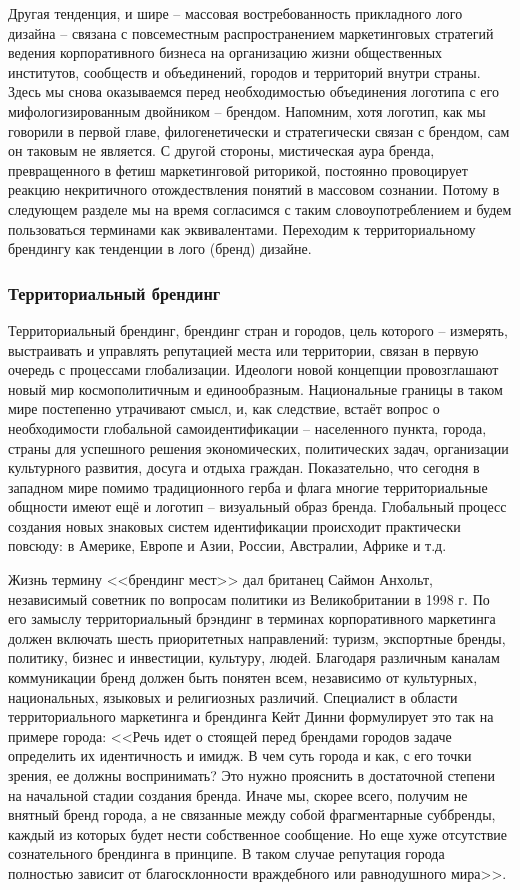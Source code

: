 Другая тенденция, и шире -- массовая  востребованность  прикладного лого дизайна -- связана с
повсеместным распространением  маркетинговых стратегий ведения корпоративного бизнеса на организацию
жизни общественных институтов, сообществ и объединений, городов и территорий внутри страны. Здесь мы
снова оказываемся перед необходимостью объединения логотипа с его мифологизированным двойником --
брендом. Напомним, хотя логотип, как мы говорили в первой главе, филогенетически и стратегически
связан с брендом, сам он таковым не является. С другой стороны, мистическая аура бренда,
превращенного в фетиш маркетинговой риторикой, постоянно провоцирует реакцию некритичного
отождествления понятий в массовом сознании. Потому в следующем разделе мы на время согласимся с
таким словоупотреблением и будем пользоваться терминами как эквивалентами. Переходим к
территориальному брендингу как тенденции в лого (бренд) дизайне.

\subsubsection{Территориальный брендинг}

Территориальный брендинг, брендинг стран и городов, цель которого -- измерять, выстраивать и
управлять репутацией места или территории, связан в первую очередь с процессами
глобализации. Идеологи новой концепции провозглашают  новый мир  космополитичным и единообразным.
Национальные границы в таком мире постепенно утрачивают смысл, и, как следствие, встаёт вопрос о
необходимости глобальной самоидентификации --  населенного пункта, города, страны  для успешного
решения экономических, политических задач, организации культурного развития, досуга и отдыха
граждан. Показательно, что сегодня в западном мире помимо традиционного герба и флага многие
территориальные общности имеют ещё и логотип -- визуальный образ бренда. Глобальный процесс создания
новых знаковых систем идентификации происходит практически повсюду: в Америке, Европе и Азии,
России, Австралии, Африке и т.д.

Жизнь термину <<брендинг мест>> дал британец Саймон Анхольт, независимый советник по вопросам
политики из Великобритании в 1998 г. По его замыслу территориальный брэндинг в терминах
корпоративного маркетинга должен включать шесть приоритетных направлений: туризм, экспортные бренды,
политику, бизнес и инвестиции, культуру, людей. Благодаря различным каналам коммуникации бренд
должен быть понятен всем, независимо от культурных, национальных, языковых и религиозных
различий. Специалист в области территориального маркетинга и брендинга Кейт Динни формулирует это
так на примере города: <<Речь идет о стоящей перед брендами городов задаче определить их идентичность
и имидж. В чем суть города и как, с его точки зрения, ее должны воспринимать? Это нужно прояснить в
достаточной степени на начальной стадии создания бренда. Иначе мы, скорее всего, получим не внятный
бренд города, а не связанные между собой фрагментарные суббренды, каждый из которых будет нести
собственное сообщение. Но еще хуже отсутствие сознательного брендинга в принципе. В таком случае
репутация города полностью зависит от благосклонности враждебного или равнодушного
мира>>. \autocite[][127-128]{book:dinni}

